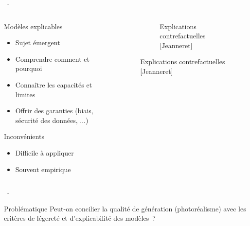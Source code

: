 \documentclass[aspectratio=169, 22pt]{beamer}
\begin{document}
\begin{frame}{\secname~- \subsecname}
  \begin{columns}
    \begin{column}{0.5\linewidth}
      \begin{block}{Modèles explicables}        
        \begin{itemize}
        \item \small Sujet émergent
        \item \small Comprendre comment et pourquoi 
        \item \small Connaître les capacités et limites
        \item \small Offrir des garanties (biais, sécurité des données, ...)
        \end{itemize}
      \end{block}
      \begin{alertblock}{Inconvénients}
        \begin{itemize}
        \item \small Difficile à appliquer
        \item \small Souvent empirique
        \end{itemize}
      \end{alertblock}
    \end{column}
    \begin{column}{0.5\linewidth}
      \begin{figure}
        \begin{subfigure}{0.45\linewidth}
          \caption{Explications contrefactuelles [Jeanneret]}
        \end{subfigure}
      \end{figure}
    \end{column}
  \end{columns}    
\end{frame}

\begin{frame}{\secname~- \subsecname}
  \begin{customblock}{\centering Problématique}
    \centering
    Peut-on concilier la qualité de génération (photoréalisme) avec
    les critères de légereté et d'explicabilité des modèles ?
  \end{customblock}
\end{frame}
\end{document}
